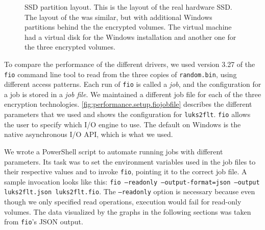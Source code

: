 \begin{figure}[htb!]
	\caption[
		SSD partition layout
	]{
		SSD partition layout. This is the layout of the real hardware SSD. The layout of the  was similar, but with additional Windows partitions behind the the encrypted volumes. The virtual machine had a virtual disk for the Windows installation and another one for the three encrypted volumes.
	}
	\label{fig:performance.setup.disklayout}
\end{figure}

To compare the performance of the different drivers, we used version 3.27 of the \texttt{fio} command line tool \cite{Fio} to read from the three copies of \texttt{random.bin}, using different access patterns. Each run of \texttt{fio} is called a \emph{job}, and the configuration for a job is stored in a \emph{job file}. We maintained a different job file for each of the three encryption technologies. \autoref{fig:performance.setup.fiojobfile} describes the different parameters that we used and shows the configuration for \texttt{luks2flt}. \texttt{fio} allows the user to specify which I/O engine to use. The default on Windows is the native asynchronous I/O API, which is what we used.

We wrote a PowerShell script to automate running jobs with different parameters. Its task was to set the environment variables used in the job files to their respective values and to invoke \texttt{fio}, pointing it to the correct job file. A sample invocation looks like this: \texttt{fio ---readonly ---output-format=json ---output luks2flt.json luks2flt.fio}. The \texttt{---readonly} option is necessary because even though we only specified read operations, execution would fail for read-only volumes. The data visualized by the graphs in the following sections was taken from \texttt{fio}'s JSON output.

